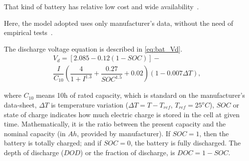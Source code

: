 \documentclass[journal]{IEEEtran}
\begin{document}
%
%
%
%
%
%
That kind of battery has relative low cost and wide availability~\cite{Copetti}. 

Here, the model adopted uses only manufacturer's data, without the need of empirical tests~\cite{Copetti}. %

The discharge voltage equation is described in \eqref{eq:bat_Vd}. 
%
\begin{multline}
\label{eq:bat_Vd}
V_{d} = \left[ 2.085-0.12(1-SOC) \right] - \\ \dfrac{I}{C_{10}} \left( \dfrac{4}{1+I^{1.3}} + \dfrac{0.27}{SOC^{1.5}}+0.02 \right) (1-0.007 \Delta T),
\end{multline}

\noindent where $C_{10}$ means 10h of rated capacity, which is standard on the manufacturer's data-sheet, $\Delta T$ is temperature variation ($\Delta T=T-T_{ref} $, $ T_{ref}=25^{o}C $), $ SOC $ or state of charge indicates how much electric charge is stored in the cell at given time. Mathematically, it is the ratio between the present capacity and the nominal capacity (in $ Ah $, provided by manufacturer). If $SOC=1$, then the battery is totally charged; and if $ SOC=0 $, the battery is fully discharged.  %
%
%
The depth of discharge ($DOD$) or the fraction of discharge, is $DOC=1-SOC$.
\end{document}

